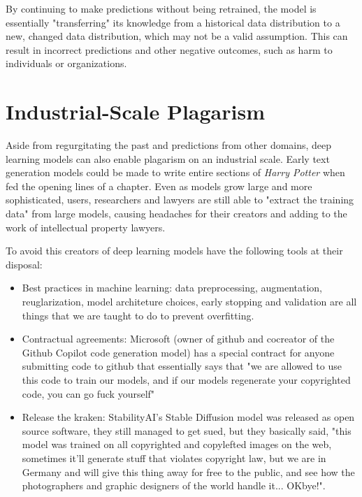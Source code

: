 By continuing to make predictions without being retrained, the model is essentially "transferring" its knowledge from a historical data distribution to a new, changed data distribution, which may not be a valid assumption. This can result in incorrect predictions and other negative outcomes, such as harm to individuals or organizations.

\section{Industrial-Scale Plagarism}

Aside from regurgitating the past and predictions from other domains, deep learning models can also enable plagarism on an industrial scale. Early text generation models could be made to write entire sections of \textit{Harry Potter} when fed the opening lines of a chapter. Even as models grow large and more sophisticated, users, researchers and lawyers are still able to "extract the training data"  from large models, causing headaches for their creators and adding to the work of intellectual property lawyers. 

To avoid this creators of deep learning models have the following tools at their disposal:


\begin{itemize}
\item Best practices in  machine learning: data preprocessing, augmentation, reuglarization, model architeture choices, early stopping and validation are all things that we are taught to do to prevent overfitting.
\item Contractual agreements: Microsoft (owner of github and cocreator of the Github Copilot code generation model) has a special contract for anyone submitting code to github that essentially says that "we are allowed to use this code to train our models, and if our models regenerate your copyrighted code, you can go fuck yourself"
\item Release the kraken: StabilityAI's Stable Diffusion model was released as open source software, they still managed to get sued, but they basically said, "this model was trained on all copyrighted and copylefted images on the web, sometimes it'll generate stuff that violates copyright law, but we are in Germany and will give this thing away for free to the public, and see how the photographers and graphic designers of the world handle it... OKbye!". 
\end{itemize}

